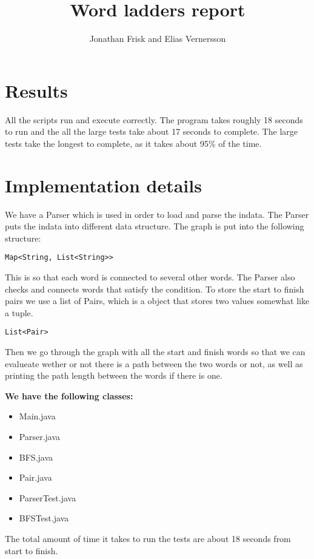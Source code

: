 \documentclass{article}
\title{Word ladders report}
\author{Jonathan Frisk and Elias Vernersson}
\begin{document}
  \maketitle

  \section{Results}

  
  \par All the scripts run and execute correctly. The program takes roughly 18 seconds to run and the all the large tests take about 17 seconds to complete. The large tests take the longest to complete, as it takes about 95\% of the time. 
  
  
  \section{Implementation details}


  \par We have a Parser which is used in order to load and parse the indata. The Parser puts the indata into different data structure. The graph is put into the following structure:
\begin{lstlisting}
Map<String, List<String>>
\end{lstlisting}
This is so that each word is connected to several other words. The Parser also checks and connects words that satisfy the condition. To store the start to finish pairs we use a list of Pairs, which is a object that stores two values somewhat like a tuple.
\begin{lstlisting}
List<Pair>
\end{lstlisting}
Then we go through the graph with all the start and finish words so that we can evalueate wether or not there is a path between the two words or not, as well as printing the path length between the words if there is one.

  \textbf{We have the following classes:}
  \begin{itemize}
  \item Main.java
  \item Parser.java
  \item BFS.java
  \item Pair.java
  \item ParserTest.java
  \item BFSTest.java   
  \end{itemize}

  \par The total amount of time it takes to run the tests are about 18 seconds from start to finish.
\end{document}
